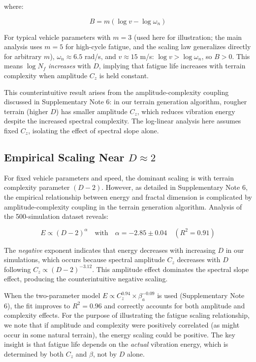 \documentclass[11pt]{article}
\begin{document}
where:

\begin{equation}
B = m(\log v - \log \omega_n)
\end{equation}

For typical vehicle parameters with $m = 3$ (used here for illustration; the main analysis uses $m = 5$ for high-cycle fatigue, and the scaling law generalizes directly for arbitrary $m$), $\omega_n \approx 6.5$ rad/s, and $v \approx 15$ m/s: $\log v > \log \omega_n$, so $B > 0$. This means $\log N_f$ \textit{increases} with $D$, implying that fatigue life increases with terrain complexity when amplitude $C_z$ is held constant. 

This counterintuitive result arises from the amplitude-complexity coupling discussed in Supplementary Note 6: in our terrain generation algorithm, rougher terrain (higher $D$) has smaller amplitude $C_z$, which reduces vibration energy despite the increased spectral complexity. The log-linear analysis here assumes fixed $C_z$, isolating the effect of spectral slope alone.

\subsection{Empirical Scaling Near $D \approx 2$}

For fixed vehicle parameters and speed, the dominant scaling is with terrain complexity parameter $(D-2)$. However, as detailed in Supplementary Note 6, the empirical relationship between energy and fractal dimension is complicated by amplitude-complexity coupling in the terrain generation algorithm. Analysis of the 500-simulation dataset reveals:

\begin{equation}
E \propto (D-2)^\alpha \quad \text{with} \quad \alpha = -2.85 \pm 0.04 \quad (R^2 = 0.91)
\end{equation}

The \textit{negative} exponent indicates that energy decreases with increasing $D$ in our simulations, which occurs because spectral amplitude $C_z$ decreases with $D$ following $C_z \propto (D-2)^{-3.12}$. This amplitude effect dominates the spectral slope effect, producing the counterintuitive negative scaling.

When the two-parameter model $E \propto C_z^{0.94} \times \beta_a^{-0.09}$ is used (Supplementary Note 6), the fit improves to $R^2 = 0.96$ and correctly accounts for both amplitude and complexity effects. For the purpose of illustrating the fatigue scaling relationship, we note that if amplitude and complexity were positively correlated (as might occur in some natural terrain), the energy scaling could be positive. The key insight is that fatigue life depends on the \textit{actual} vibration energy, which is determined by both $C_z$ and $\beta$, not by $D$ alone.
\end{document}
